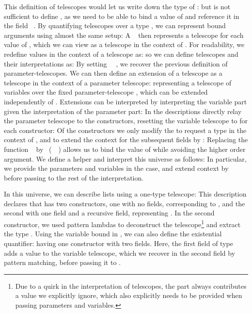 This definition of telescopes would let us write down the type of :
but is not sufficient to define , as we need to be able to bind a value  of  and reference it in the field \ . By quantifying telescopes over a type \cite{practgen}, we can represent bound arguments using almost the same setup:
A \  then represents a telescope for each value of , which we can view as a telescope in the context of . For readability, we redefine values in the context of a telescope as:
so we can define telescopes and their interpretations as:
By setting \ \AV{=}\ , we recover the previous definition of parameter-telescopes. We can then define an extension of a telescope as a telescope in the context of a parameter telescope:
representing a telescope of variables over the fixed parameter-telescope , which can be extended independently of . Extensions can be interpreted by interpreting the variable part given the interpretation of the parameter part:
In the descriptions directly relay the parameter telescope to the constructors, resetting the variable telescope to  for each constructor:
Of the constructors we only modify the  to request a type  in the context of , and to extend the context for the subsequent fields by :
Replacing the function \  by \ (\ \ ) allows us to bind the value of  while avoiding the higher order argument. 
We define a helper
and interpret this universe as follows:
In particular, we provide  the parameters and variables in the  case, and extend context by  before passing to the rest of the interpretation.

In this universe, we can describe lists using a one-type telescope:
This description declares that  has two constructors, one with no fields, corresponding to \AIC{[]}, and the second with one field and a recursive field, representing . In the second constructor, we used pattern lambdas to deconstruct the telescope\footnote{Due to a quirk in the interpretation of telescopes, the  part always contributes a value  we explicitly ignore, which also explicitly needs to be provided when passing parameters and variables.} and extract the type .
Using the variable bound in , we can also define the existential quantifier:
having one constructor with two fields. Here, the first field of type  adds a value  to the variable telescope, which we recover in the second field by pattern matching, before passing it to .


